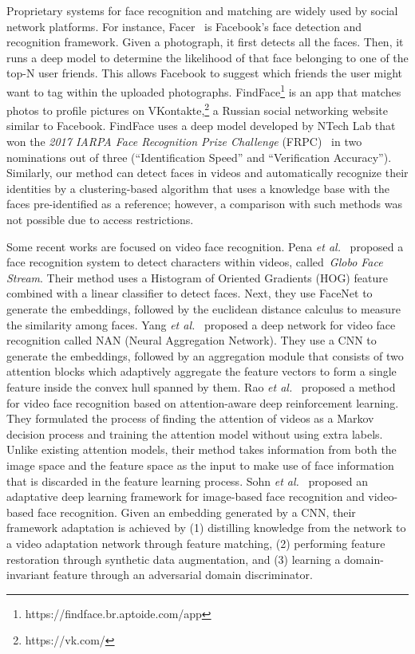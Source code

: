 Proprietary systems for face recognition and matching are widely used by social network platforms. For instance, Facer~\cite{hazelwood2018applied} is Facebook's face detection and recognition framework. Given a photograph, it first detects all the faces. Then, it runs a  deep model to determine the likelihood of that face belonging to one of the top-N user friends. This allows  Facebook to suggest which friends the user might want to tag within the uploaded photographs. FindFace\footnote{https://findface.br.aptoide.com/app} is an app that matches photos to profile pictures on VKontakte,\footnote{https://vk.com/} a Russian social networking website similar to Facebook. FindFace uses a deep model developed by NTech Lab that won the \textit{2017 IARPA Face Recognition Prize Challenge} (FRPC)~\cite{grother20172017}  in two nominations out of three (“Identification Speed” and “Verification Accuracy”). Similarly, our method can detect faces in videos and automatically recognize their identities by a clustering-based algorithm that uses a knowledge base with the faces pre-identified as a reference; however, a comparison with such methods was not possible due to access restrictions.

Some recent works are focused on video face recognition. Pena \textit{et al.}~\cite{globofacestream} proposed a face recognition system to detect characters within videos, called~\textit{Globo Face Stream}. Their method uses a Histogram of Oriented Gradients (HOG) feature combined with a linear classifier to detect faces. Next, they use  FaceNet to generate the embeddings, followed by the euclidean distance calculus to measure the similarity among faces. Yang \textit{et al.}~\cite{yang2017neural} proposed a deep network for video face recognition called NAN (Neural Aggregation Network). They use a CNN to generate the embeddings, followed by an aggregation module that consists of two attention blocks which adaptively aggregate the feature vectors to form a single feature inside the convex hull spanned by them. Rao \textit{et al.}~\cite{rao2017attention} proposed a method for video face recognition based on attention-aware deep reinforcement learning. They formulated the process of finding the attention of videos as a Markov decision process and training the attention model without using extra labels. Unlike existing attention models, their method takes information from both the image space and the feature space as the input to make use of face information that is discarded in the feature learning process. Sohn \textit{et al.}~\cite{sohn2017unsupervised} proposed an adaptative deep learning framework for image-based face recognition and video-based face recognition. Given an embedding generated by a CNN, their framework adaptation is achieved by (1) distilling knowledge from the network to a video adaptation network through feature matching, (2) performing feature restoration through synthetic data augmentation, and (3) learning a domain-invariant feature through an adversarial domain discriminator. 

